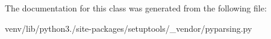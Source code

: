 The documentation for this class was generated from the following file\+:\begin{DoxyCompactItemize}
\item 
venv/lib/python3./site-\/packages/setuptools/\+\_\+vendor/pyparsing.\+py\end{DoxyCompactItemize}

